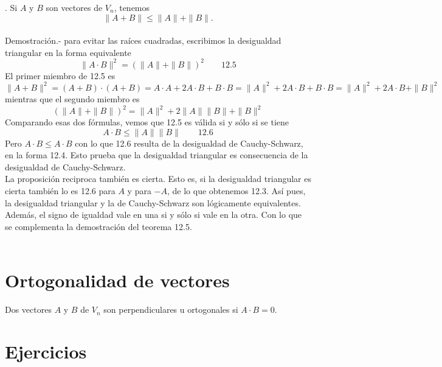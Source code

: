\begin{teo}. Si $A$ y $B$ son vectores de $V_n$, tenemos $$\|A+B\| \leq \|A\|+\|B\|.$$\\
    Demostración.-\; para evitar las raíces cuadradas, escribimos la desigualdad triangular en la forma equivalente $$\|A\cdot B\|^2 = \left(\|A\|+\|B\|\right)^2\qquad \mbox{12.5}$$
    El primer miembro de 12.5 es $$\|A+B\|^2 = (A+B)\cdot (A+B) = A\cdot A + 2A\cdot B + B\cdot B = \|A\|^2 + 2A\cdot B + B\cdot B = \|A\|^2 + 2A\cdot B + \|B\|^2$$
    mientras que el segundo miembro es $$\left(\|A\|+\|B\|\right)^2 = \|A\|^2 + 2\|A\|\|B\|+\|B\|^2$$
    Comparando esas dos fórmulas, vemos que 12.5 es válida si y sólo si se tiene $$A\cdot B \leq \|A\|\|B\|\qquad 12.6$$
    Pero $A\cdot B\leq A\cdot B$ con lo que 12.6 resulta de la desigualdad de Cauchy-Schwarz, en la forma 12.4. Esto prueba que la desigualdad triangular es consecuencia de la desigualdad de Cauchy-Schwarz.\\
    La proposición reciproca también es cierta. Esto es, si la desigualdad triangular es cierta también lo es 12.6 para $A$ y para $-A$, de lo que obtenemos 12.3. Así pues, la desigualdad triangular y la de Cauchy-Schwarz son lógicamente equivalentes. Además, el signo de igualdad vale en una si y sólo si vale en la otra. Con lo que se complementa la demostración del teorema 12.5.\\\\

\end{teo}

\section{Ortogonalidad de vectores}

\begin{tcolorbox}
\begin{def.} Dos vectores $A$ y $B$ de $V_n$ son perpendiculares u ortogonales si $A\cdot B=0$.
\end{def.}
\end{tcolorbox}


\section{Ejercicios}

